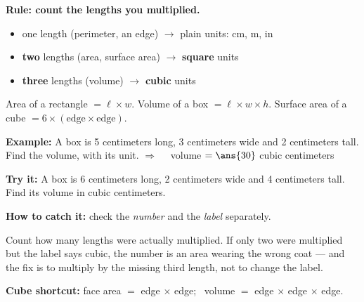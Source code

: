 \documentclass[12pt]{article}
\begin{document}


\begin{formulabox}
\textbf{Rule: count the lengths you multiplied.}\\[3pt]
\begin{itemize}[label={$\bullet$}, leftmargin=1.2cm, itemsep=1pt, topsep=2pt]
  \item one length (perimeter, an edge) $\rightarrow$ plain units: cm, m, in
  \item \textbf{two} lengths (area, surface area) $\rightarrow$ \textbf{square} units
  \item \textbf{three} lengths (volume) $\rightarrow$ \textbf{cubic} units
\end{itemize}
\smallskip
Area of a rectangle $= \ell \times w$. \quad Volume of a box $= \ell \times w \times h$.
\quad Surface area of a cube $= 6 \times (\text{edge} \times \text{edge})$.
\end{formulabox}

\begin{examplebox}
\textbf{Example:} \quad A box is 5 centimeters long, 3 centimeters wide and 2 centimeters
tall. Find the volume, with its unit.
$\Rightarrow\quad$ volume $= \ans{30}$ cubic centimeters
\end{examplebox}

\begin{tryitbox}
\textbf{Try it:} \quad A box is 6 centimeters long, 2 centimeters wide and 4 centimeters
tall. Find its volume in cubic centimeters.\\[2pt]
\end{tryitbox}


\begin{formulabox}
\textbf{How to catch it:} check the \emph{number} and the \emph{label} separately.\par
Count how many lengths were actually multiplied. If only two were multiplied but the
label says cubic, the number is an area wearing the wrong coat --- and the fix is to
multiply by the missing third length, not to change the label.\par
\textbf{Cube shortcut:} face area $=$ edge $\times$ edge; \ volume $=$ edge $\times$ edge
$\times$ edge.
\end{formulabox}
\end{document}

